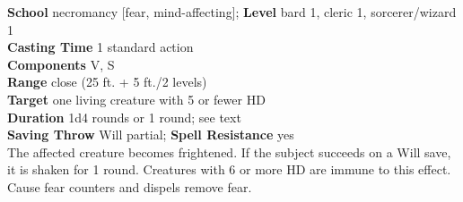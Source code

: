 \textbf{School} necromancy [fear, mind-affecting]; \textbf{Level} bard 1, cleric 1, sorcerer/wizard 1\\
\textbf{Casting Time} 1 standard action\\
\textbf{Components} V, S\\
\textbf{Range} close (25 ft. + 5 ft./2 levels)\\
\textbf{Target} one living creature with 5 or fewer HD\\
\textbf{Duration} 1d4 rounds or 1 round; see text\\
\textbf{Saving Throw }Will partial; \textbf{Spell Resistance} yes\\
The affected creature becomes frightened. If the subject succeeds on a Will save, it is shaken for 1 round. Creatures with 6 or more HD are immune to this effect. Cause fear counters and dispels remove fear.\\
